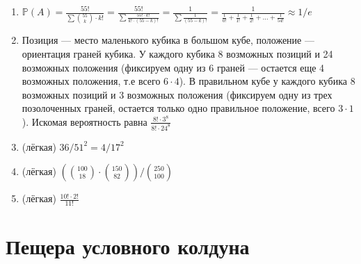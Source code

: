 \documentclass[a4paper,12pt]{article}
\def \P{\mathbb{P}}
\begin{document}
\begin{enumerate}
\item
$\P(A) = \frac{55!}{\sum\binom{55}{k}\cdot k!} = \frac{55!}{\sum\frac{55!\cdot k!}{k!\cdot (55-k)!}}=\frac{1}{\sum \frac{1}{(55-k)!}} = \frac{1}{\frac{1}{0!}+\frac{1}{1!}+\frac{1}{2!}+\dots+\frac{1}{54!}}\approx1/e$


\item
Позиция — место маленького кубика в большом кубе, положение — ориентация граней кубика. 
У каждого кубика 8 возможных позиций и 24 возможных положения (фиксируем одну из 6 граней — остается еще 4 возможных положения, т.е всего $6\cdot4$). 
В правильном кубе у каждого кубика 8 возможных позиций и 3 возможных положения 
(фиксируем одну из трех позолоченных граней, остается только одно правильное положение, всего $3\cdot1$). 
Искомая вероятность равна $\frac{8!\cdot3^8}{8!\cdot24^8}$
\item (лёгкая)
$36/51^2 = 4/17^2$
\item (лёгкая)
$(\binom{100}{18}\cdot\binom{150}{82})/\binom{250}{100}$
\item (лёгкая)
$\frac{10!\cdot2!}{11!}$
\end{enumerate}
\newpage

\section{Пещера условного колдуна} %
\end{document}
